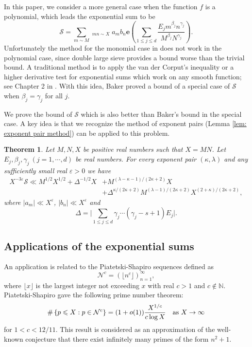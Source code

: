 \documentclass[12pt, reqno, twoside, letterpaper]{amsart}
\numberwithin{equation}{section}
\newcommand{\cS}{\ensuremath{\mathcal{S}}}
\theoremstyle{customthm}
\newtheorem{theorem}[X]{Theorem}
\theoremstyle{customrem}
\begin{document}
In this paper, we consider a more general case when the function $f$ is a polynomial, which leads the exponential sum to be
$$
\cS= \sum_{m\sim M}\mathop{\sum_{n\sim N}}_{mn\sim X}a_mb_n
\mathbf{e}\left(\sum_{1\leqslant j\leqslant d}
\frac{E_jm^{\beta_j}n^{\gamma_j}}{M^{\beta_j}N^{\gamma_j}}\right).
$$
Unfortunately the method for the monomial case in \cite{BI1986, FI1989, RS2006} does not work in the polynomial case, since double large sieve provides a bound worse than the trivial bound. A traditional method is to apply the van der Corput's inequality or a higher derivative test for exponential sums which work on any smooth function; see Chapter 2 in \cite{GrahamK1991}. With this idea, Baker \cite{Baker2014} proved a bound of a special case of $\cS$ when $\beta_j = \gamma_j$ for all $j$.

We prove the bound of $\cS$ which is also better than Baker's bound in the special case. A key idea is that we recognize the method of exponent pairs (Lemma  \ref{lem: exponent pair method}) can be applied to this problem.

\begin{theorem}\label{theorem: 1}
Let $M,N,X$ be positive real numbers such that $X=MN$.
Let $E_j,\beta_j,\gamma_j\ (j=1,\cdots,d)$ be real numbers.
For every exponent pair $(\kappa,\lambda)$ and any sufficiently small real
$\varepsilon>0$ we have
\begin{align*}
X^{-3\varepsilon}\cS\ll M^{1/2}X^{1/2}+\Delta^{-1/2}X
&+M^{(\lambda-\kappa-1)/(2\kappa+2)}X\\
&+\Delta^{\kappa/(2\kappa+2)}M^{(\lambda-1)/(2\kappa+2)}X^{(2+\kappa)/(2\kappa+2)},
\end{align*}
where $|a_m|\ll X^{\varepsilon}$, $|b_n|\ll X^{\varepsilon}$ and
$$
\Delta=\Bigg|\sum_{1\leqslant j\leqslant d}\gamma_j\cdots(\gamma_j-s+1)E_j\Bigg|.
$$
\end{theorem}

\subsection{Applications of the exponential sums}
An application is related to the Piatetski-Shapiro sequences defined as
$$
\mathcal{N}^c=(\lfloor n^c\rfloor)_{n=1}^{\infty},
$$
where $\lfloor x\rfloor$ is the largest integer not exceeding $x$ with real $c>1$ and $c\not\in\mathbb{N}$. Piatetski-Shapiro \cite{Shapiro1953} gave the following prime number theorem:
\begin{align}\label{eq: Piatetski-Shapiro}
\#\left\{p\leqslant X: p\in \mathcal{N}^c\right\}
=(1+o(1))\frac{X^{1/c}}{c\log X}\ \ \ \hbox{as}\ X\rightarrow\infty
\end{align}
for $1<c<12/11$. This result is considered as an approximation of the well-known conjecture that there exist infinitely many primes of the form $n^2+1$.
\end{document}
